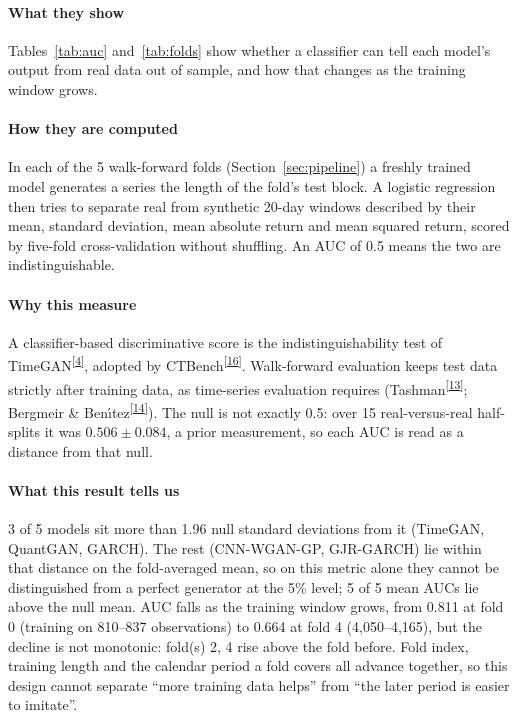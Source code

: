 \documentclass[11pt,a4paper]{article}
\makeatletter
\newcommand{\tcite}[1]{\textsuperscript{[\hyperlink{R:#1}{#1}]}}
\DeclareRobustCommand{\_}{\ifmmode\nfss@text{\textunderscore}\else\textunderscore\allowbreak\fi}
\makeatother
\begin{document}
\paragraph{What they show} Tables~\ref{tab:auc} and~\ref{tab:folds} show whether a classifier can tell each model's output from real data out of sample, and how that changes as the training window grows.

\paragraph{How they are computed} In each of the 5 walk-forward folds (Section~\ref{sec:pipeline}) a freshly trained model generates a series the length of the fold's test block. A logistic regression then tries to separate real from synthetic 20-day windows described by their mean, standard deviation, mean absolute return and mean squared return, scored by five-fold cross-validation without shuffling. An AUC of 0.5 means the two are indistinguishable.

\paragraph{Why this measure} A classifier-based discriminative score is the indistinguishability test of TimeGAN\tcite{4}, adopted by CTBench\tcite{16}. Walk-forward evaluation keeps test data strictly after training data, as time-series evaluation requires (Tashman\tcite{13}; Bergmeir \& Ben\'{\i}tez\tcite{14}). The null is not exactly 0.5: over 15 real-versus-real half-splits it was $0.506\pm0.084$, a prior measurement, so each AUC is read as a distance from that null.

\paragraph{What this result tells us} 3 of 5 models sit more than 1.96 null standard deviations from it (TimeGAN, QuantGAN, GARCH). The rest (CNN-WGAN-GP, GJR-GARCH) lie within that distance on the fold-averaged mean, so on this metric alone they cannot be distinguished from a perfect generator at the 5\% level; 5 of 5 mean AUCs lie above the null mean. AUC falls as the training window grows, from 0.811 at fold 0 (training on 810--837 observations) to 0.664 at fold 4 (4,050--4,165), but the decline is not monotonic: fold(s) 2, 4 rise above the fold before. Fold index, training length and the calendar period a fold covers all advance together, so this design cannot separate ``more training data helps'' from ``the later period is easier to imitate''.
\end{document}
